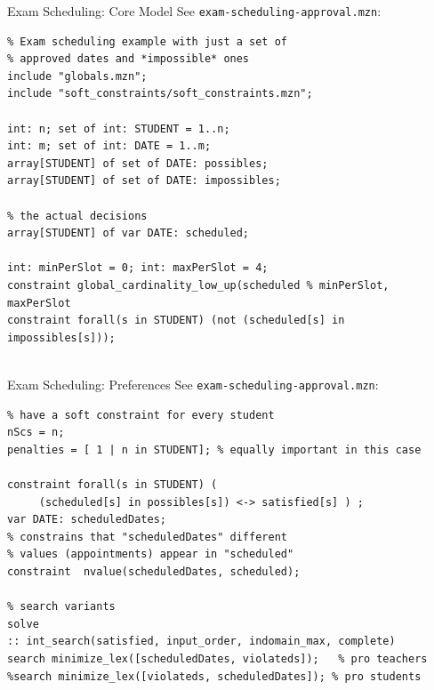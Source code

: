 \documentclass[handout,10pt,xcolor={dvipsnames},fleqn]{beamer}
\begin{document}
\begin{frame}[fragile]{Exam Scheduling: Core Model}
See \texttt{exam-scheduling-approval.mzn}:
\begin{lstlisting}
% Exam scheduling example with just a set of 
% approved dates and *impossible* ones
include "globals.mzn";
include "soft_constraints/soft_constraints.mzn";

int: n; set of int: STUDENT = 1..n; 
int: m; set of int: DATE = 1..m;
array[STUDENT] of set of DATE: possibles;
array[STUDENT] of set of DATE: impossibles;

% the actual decisions
array[STUDENT] of var DATE: scheduled;

int: minPerSlot = 0; int: maxPerSlot = 4;
constraint global_cardinality_low_up(scheduled % minPerSlot, maxPerSlot
constraint forall(s in STUDENT) (not (scheduled[s] in impossibles[s])); 
 
\end{lstlisting}
\end{frame}

\begin{frame}[fragile]{Exam Scheduling: Preferences}
See \texttt{exam-scheduling-approval.mzn}:
\begin{lstlisting}
% have a soft constraint for every student
nScs = n;
penalties = [ 1 | n in STUDENT]; % equally important in this case 

constraint forall(s in STUDENT) ( 
     (scheduled[s] in possibles[s]) <-> satisfied[s] ) ;
var DATE: scheduledDates;
% constrains that "scheduledDates" different 
% values (appointments) appear in "scheduled"
constraint  nvalue(scheduledDates, scheduled);

% search variants 
solve 
:: int_search(satisfied, input_order, indomain_max, complete)
search minimize_lex([scheduledDates, violateds]);   % pro teachers
%search minimize_lex([violateds, scheduledDates]); % pro students
\end{lstlisting}
\end{frame}
\end{document}
